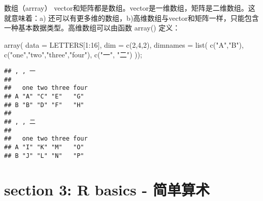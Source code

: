\documentclass[ignorenonframetext,]{beamer}
\newenvironment{Shaded}{\begin{snugshade}}{\end{snugshade}}
\newcommand{\AttributeTok}[1]{\textcolor[rgb]{0.77,0.63,0.00}{#1}}
\newcommand{\DecValTok}[1]{\textcolor[rgb]{0.00,0.00,0.81}{#1}}
\newcommand{\FunctionTok}[1]{\textcolor[rgb]{0.00,0.00,0.00}{#1}}
\newcommand{\NormalTok}[1]{#1}
\newcommand{\SpecialCharTok}[1]{\textcolor[rgb]{0.00,0.00,0.00}{#1}}
\newcommand{\StringTok}[1]{\textcolor[rgb]{0.31,0.60,0.02}{#1}}
\newcommand\FontSmall{\fontsize{7}{8}\selectfont}
\begin{document}
\begin{frame}[fragile]{数组（arrray）}
\protect\hypertarget{ux6570ux7ec4arrray}{}
vector和矩阵都是数组。vector是一维数组，矩阵是二维数组。这就意味着：a)
还可以有更多维的数组，b)高维数组与vector和矩阵一样，只能包含一种基本数据类型。高维数组可以由函数
array() 定义：

\FontSmall

\begin{Shaded}
\begin{Highlighting}[]
\FunctionTok{array}\NormalTok{( }\AttributeTok{data =}\NormalTok{ LETTERS[}\DecValTok{1}\SpecialCharTok{:}\DecValTok{16}\NormalTok{], }
      \AttributeTok{dim  =} \FunctionTok{c}\NormalTok{(}\DecValTok{2}\NormalTok{,}\DecValTok{4}\NormalTok{,}\DecValTok{2}\NormalTok{), }
      \AttributeTok{dimnames =} \FunctionTok{list}\NormalTok{( }\FunctionTok{c}\NormalTok{(}\StringTok{"A"}\NormalTok{,}\StringTok{"B"}\NormalTok{), }
                      \FunctionTok{c}\NormalTok{(}\StringTok{"one"}\NormalTok{,}\StringTok{"two"}\NormalTok{,}\StringTok{"three"}\NormalTok{,}\StringTok{"four"}\NormalTok{), }
                      \FunctionTok{c}\NormalTok{(}\StringTok{"一"}\NormalTok{, }\StringTok{"二"}\NormalTok{) ));}
\end{Highlighting}
\end{Shaded}

\begin{verbatim}
## , , 一
## 
##   one two three four
## A "A" "C" "E"   "G" 
## B "B" "D" "F"   "H" 
## 
## , , 二
## 
##   one two three four
## A "I" "K" "M"   "O" 
## B "J" "L" "N"   "P"
\end{verbatim}
\end{frame}

\hypertarget{section-3-r-basics---ux7b80ux5355ux7b97ux672f}{%
\section{section 3: R basics -
简单算术}\label{section-3-r-basics---ux7b80ux5355ux7b97ux672f}}
\end{document}
